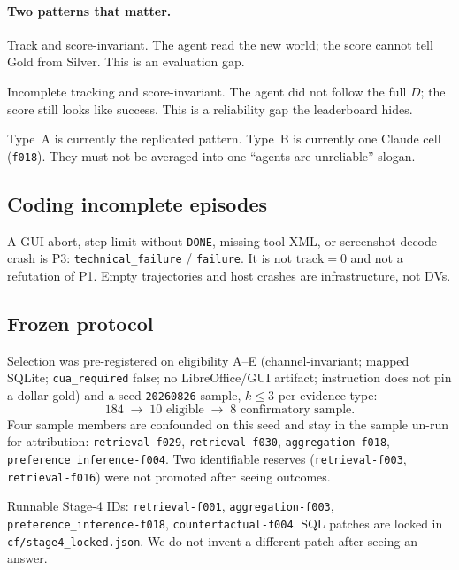 \documentclass[11pt]{article}
\newcommand{\task}[1]{\texttt{#1}}
\newcommand{\Pone}{\textsc{P1}}
\newcommand{\Pthree}{\textsc{P3}}
\begin{document}
\paragraph{Two patterns that matter.}
\begin{description}[leftmargin=1.6em,style=nextline,itemsep=0.35em]
  \item[Type A.] Track and score-invariant.
        The agent read the new world; the score cannot tell Gold from
        Silver. This is an evaluation gap.
  \item[Type B.] Incomplete tracking and score-invariant.
        The agent did not follow the full $D$; the score still looks
        like success. This is a reliability gap the leaderboard hides.
\end{description}
Type~A is currently the replicated pattern. Type~B is currently one
Claude cell (\task{f018}). They must not be averaged into one ``agents
are unreliable'' slogan.

\subsection{Coding incomplete episodes}

A GUI abort, step-limit without \texttt{DONE}, missing tool XML, or
screenshot-decode crash is \Pthree{}: \texttt{technical\_failure} /
\texttt{failure}. It is not $\mathrm{track}=0$ and not a refutation of
\Pone{}. Empty trajectories and host crashes are infrastructure, not
DVs.

\subsection{Frozen protocol}

Selection was pre-registered on eligibility A--E (channel-invariant;
mapped SQLite; \texttt{cua\_required} false; no LibreOffice/GUI
artifact; instruction does not pin a dollar gold) and a seed
\texttt{20260826} sample, $k\le 3$ per evidence type:
\[
184 \;\to\; 10\text{ eligible} \;\to\; 8\text{ confirmatory sample}.
\]
Four sample members are confounded on this seed and stay in the sample
un-run for attribution:
\task{retrieval-f029}, \task{retrieval-f030},
\task{aggregation-f018}, \task{preference\_inference-f004}.
Two identifiable reserves (\task{retrieval-f003}, \task{retrieval-f016})
were not promoted after seeing outcomes.

Runnable Stage-4 IDs: \task{retrieval-f001}, \task{aggregation-f003},
\task{preference\_inference-f018}, \task{counterfactual-f004}.
SQL patches are locked in \texttt{cf/stage4\_locked.json}. We do not
invent a different patch after seeing an answer.
\end{document}

